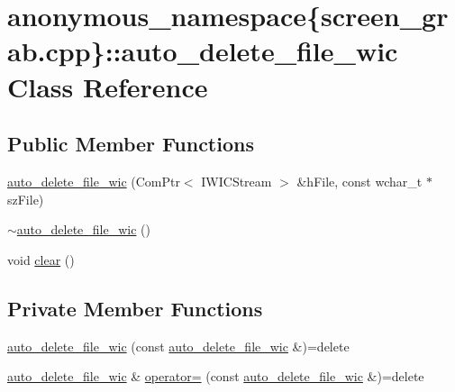 \hypertarget{classanonymous__namespace_02screen__grab_8cpp_03_1_1auto__delete__file__wic}{}\section{anonymous\+\_\+namespace\{screen\+\_\+grab.\+cpp\}\+:\+:auto\+\_\+delete\+\_\+file\+\_\+wic Class Reference}
\label{classanonymous__namespace_02screen__grab_8cpp_03_1_1auto__delete__file__wic}
\subsection*{Public Member Functions}
\begin{DoxyCompactItemize}
\item 
\mbox{\hyperlink{classanonymous__namespace_02screen__grab_8cpp_03_1_1auto__delete__file__wic_a30fc25122da7f1b86d7e3a1d07ce7e89}{auto\+\_\+delete\+\_\+file\+\_\+wic}} (Com\+Ptr$<$ I\+W\+I\+C\+Stream $>$ \&h\+File, const wchar\+\_\+t $\ast$sz\+File)
\item 
\mbox{\hyperlink{classanonymous__namespace_02screen__grab_8cpp_03_1_1auto__delete__file__wic_ab99fd8bcc3665b8663dfc7d55df9502b}{$\sim$auto\+\_\+delete\+\_\+file\+\_\+wic}} ()
\item 
void \mbox{\hyperlink{classanonymous__namespace_02screen__grab_8cpp_03_1_1auto__delete__file__wic_ac61001103d3fde78c9879eaccf938b62}{clear}} ()
\end{DoxyCompactItemize}
\subsection*{Private Member Functions}
\begin{DoxyCompactItemize}
\item 
\mbox{\hyperlink{classanonymous__namespace_02screen__grab_8cpp_03_1_1auto__delete__file__wic_a6039f45ec605fbd584d008221b80de8e}{auto\+\_\+delete\+\_\+file\+\_\+wic}} (const \mbox{\hyperlink{classanonymous__namespace_02screen__grab_8cpp_03_1_1auto__delete__file__wic}{auto\+\_\+delete\+\_\+file\+\_\+wic}} \&)=delete
\item 
\mbox{\hyperlink{classanonymous__namespace_02screen__grab_8cpp_03_1_1auto__delete__file__wic}{auto\+\_\+delete\+\_\+file\+\_\+wic}} \& \mbox{\hyperlink{classanonymous__namespace_02screen__grab_8cpp_03_1_1auto__delete__file__wic_afbf1926f3734161a6d465033c30e0d1b}{operator=}} (const \mbox{\hyperlink{classanonymous__namespace_02screen__grab_8cpp_03_1_1auto__delete__file__wic}{auto\+\_\+delete\+\_\+file\+\_\+wic}} \&)=delete
\end{DoxyCompactItemize}
